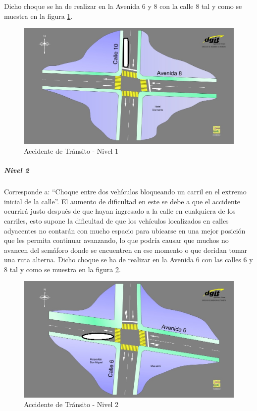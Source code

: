 Dicho choque se ha de realizar en la Avenida 6 y 8 con la calle 8 tal y como se muestra en la figura \ref{fig:acc1}.

\begin{figure}[htp]
	\centering
	\includegraphics[scale=0.4]{images/117_AV08_CA10_Acc1.jpg}
	\caption{Accidente de Tr\'{a}nsito - Nivel 1}
	\label{fig:acc1}
\end{figure}

\subparagraph{Nivel 2}
Corresponde a: “Choque entre dos veh\'{i}culos bloqueando un carril en el extremo inicial de la calle”. El aumento de dificultad en este se debe a que el accidente ocurrir\'{a} justo despu\'{e}s de que hayan ingresado a la calle en cualquiera de los carriles, esto supone la dificultad de que los veh\'{i}culos localizados en calles adyacentes no contar\'{a}n con mucho espacio para ubicarse en una mejor posici\'{o}n que les permita continuar avanzando, lo que podr\'{i}a causar que muchos no avancen del sem\'{a}foro donde se encuentren en ese momento o que decidan tomar una ruta alterna.
Dicho choque se ha de realizar en la Avenida 6 con las calles 6 y 8 tal y como se muestra en la figura \ref{fig:acc2}.

\begin{figure}[H]
	\centering
	\includegraphics[scale=0.40]{images/145_AV06_CA06_Acc2.jpg}
	\caption{Accidente de Tr\'{a}nsito - Nivel 2}
	\label{fig:acc2}
\end{figure}

